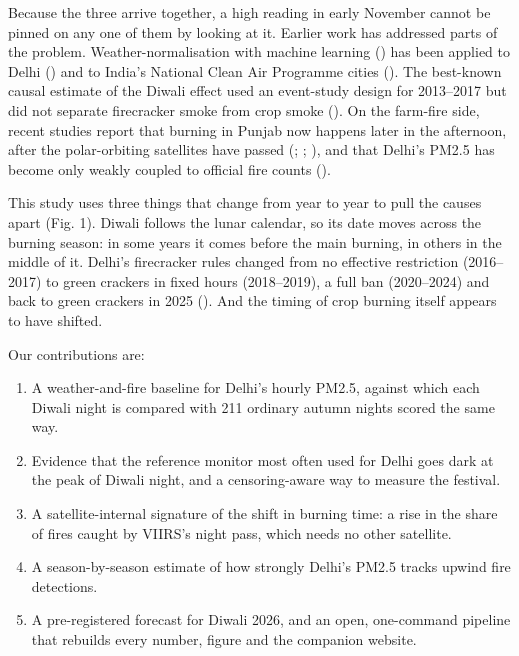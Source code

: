 \documentclass[
  11pt,
]{article}
\providecommand{\tightlist}{%
  \setlength{\itemsep}{0pt}\setlength{\parskip}{0pt}}
\begin{document}
Because the three arrive together, a high reading in early November
cannot be pinned on any one of them by looking at it. Earlier work has
addressed parts of the problem. Weather-normalisation with machine
learning () has been
applied to Delhi () and to
India's National Clean Air Programme cities
(). The best-known
causal estimate of the Diwali effect used an event-study design for
2013--2017 but did not separate firecracker smoke from crop smoke
(). On the farm-fire side,
recent studies report that burning in Punjab now happens later in the
afternoon, after the polar-orbiting satellites have passed
(;
;
), and that Delhi's PM2.5
has become only weakly coupled to official fire counts
().

This study uses three things that change from year to year to pull the
causes apart (Fig. 1). Diwali follows the lunar calendar, so its date
moves across the burning season: in some years it comes before the main
burning, in others in the middle of it. Delhi's firecracker rules
changed from no effective restriction (2016--2017) to green crackers in
fixed hours (2018--2019), a full ban (2020--2024) and back to green
crackers in 2025 (). And the
timing of crop burning itself appears to have shifted.

Our contributions are:

\begin{enumerate}
\def\labelenumi{\arabic{enumi}.}
\tightlist
\item
  A weather-and-fire baseline for Delhi's hourly PM2.5, against which
  each Diwali night is compared with 211 ordinary autumn nights scored
  the same way.
\item
  Evidence that the reference monitor most often used for Delhi goes
  dark at the peak of Diwali night, and a censoring-aware way to measure
  the festival.
\item
  A satellite-internal signature of the shift in burning time: a rise in
  the share of fires caught by VIIRS's night pass, which needs no other
  satellite.
\item
  A season-by-season estimate of how strongly Delhi's PM2.5 tracks
  upwind fire detections.
\item
  A pre-registered forecast for Diwali 2026, and an open, one-command
  pipeline that rebuilds every number, figure and the companion website.
\end{enumerate}
\end{document}
